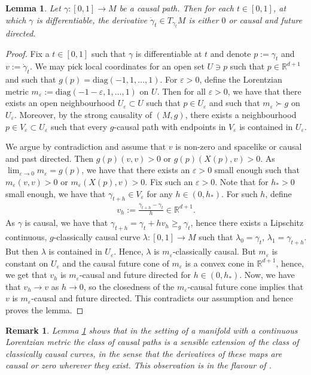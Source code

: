 \documentclass[a4paper,10pt]{article}
\newtheorem{lemma}[theorem]{Lemma}
\newtheorem{remark}[theorem]{Remark}
\numberwithin{equation}{section}
\newcommand{\R}{\mathbb{R}}
\newcommand{\e}{\varepsilon}
\newcommand{\diag}{\mathrm{diag}}
\begin{document}
\begin{lemma}\label{derivative_causal_where_exists}
    Let $\gamma\colon[0,1] \to M$ be a causal path. Then for each $t \in [0,1]$, at which $\gamma$ is differentiable, the derivative $\dot{\gamma}_t \in T_{\gamma_t}M$ is either $0$ or causal and future directed.
\end{lemma}
\begin{proof}
    Fix a $t \in [0,1]$ such that $\gamma$ is differentiable at $t$ and denote $p:= \gamma_t$ and $v := \dot{\gamma}_t$. We may pick local coordinates for an open set $ U \ni p$ such that $p \in \R^{d+1}$ and such that $g(p) = \diag(-1, 1, \ldots, 1)$. 
    For $\e >0$, define the Lorentzian metric $m_\e:= \diag(-1-\e, 1, \ldots, 1)$ on $U$. Then for all $\e >0$, we have that there exists an open neighbourhood $U_\e \subset U$ such that $p \in U_\e$ and such that $m_\e \succ g$ on $U_\e$. Moreover, by the strong causality of $(M, g)$, there exists a neighbourhood $p \in V_\e \subset U_\e$ such that every $g$-causal path with endpoints in $V_\e$ is contained in $U_\e$. 

    We argue by contradiction and assume that $v$ is non-zero and spacelike or causal and past directed. Then $g(p)(v,v) >0$ or $g(p)(X(p), v)>0$. As $\lim_{\e \to 0}m_\e = g(p)$, we have that there exists an $\e>0$ small enough such that $m_\e(v, v) >0$ or $m_\e(X(p), v)>0$. Fix such an $\e>0$. Note that for $h_* >0$ small enough, we have that $\gamma_{t+h} \in V_\e$ for any $h\in (0, h_*)$. For such $h$, define
    \begin{align*}
        v_h:= \frac{\gamma_{t+h}-\gamma_t}{h} \in \R^{d+1}. 
    \end{align*}
    As $\gamma$ is causal, we have that $\gamma_{t+h} = \gamma_t +hv_h \geq_g \gamma_t$, hence there exists a Lipschitz continuous, $g$-classically causal curve $\lambda:[0,1] \to M$ such that $\lambda_0 = \gamma_t$, $\lambda_1 = \gamma_{t+h}$. But then $\lambda$ is contained in $U_\e$. Hence, $\lambda$ is $m_\e$-classically causal. 
    But $m_\e$ is constant on $U_\e$ and the causal future cone of $m_\e$ is a convex cone in $\R^{d+1}$, hence, we get that $v_h$ is $m_\e$-causal and future directed for $h \in (0, h_*)$. 
    Now, we have that $v_h \to v$ as $h \to 0$, so the closedness of the $m_\e$-causal future cone implies that $v$ is $m_\e$-causal and future directed. This contradicts our assumption and hence proves the lemma.
\end{proof}
\begin{remark}
 Lemma \ref{derivative_causal_where_exists} shows that in the setting of a manifold with a continuous Lorentzian metric the class of causal paths is a sensible extension of the class of classically causal curves, in the sense that the derivatives of these maps are causal or zero wherever they exist. This observation is in the flavour of \cite[Proposition 5.9]{kunzinger2018lorentzian}. 
\end{remark}
\end{document}
